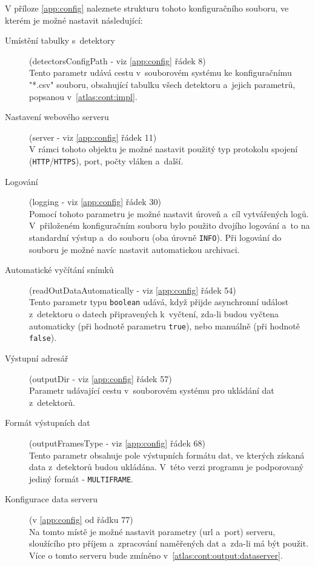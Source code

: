 V příloze \ref{app:config} naleznete strukturu tohoto konfiguračního souboru, ve kterém je možné nastavit následující:
\begin{description}
	\item[Umístění tabulky s~detektory] (detectorsConfigPath - viz \ref{app:config} řádek 8)\\
		Tento parametr udává cestu v~souborovém systému ke konfiguračnímu "*.csv" souboru, obsahující tabulku všech detektoru a~jejich parametrů, popsanou v~\ref{atlas:cont:impl}.
	\item[Nastavení webového serveru] (server - viz \ref{app:config} řádek 11)\\
		V rámci tohoto objektu je možné nastavit použitý typ protokolu spojení (\texttt{HTTP}/\texttt{HTTPS}), port, počty vláken a~další.
	\item[Logování] (logging - viz \ref{app:config} řádek 30)\\
		Pomocí tohoto parametru je možné nastavit úroveň a~cíl vytvářených logů. V~přiloženém konfiguračním souboru bylo použito dvojího logování a~to na standardní výstup a~do souboru (oba úrovně \texttt{INFO}). Při logování do souboru je možné navíc nastavit automatickou archivaci.
	\item[Automatické vyčítání snímků] (readOutDataAutomatically - viz \ref{app:config} řádek 54)\\
		Tento parametr typu \texttt{boolean} udává, když přijde asynchronní událost z~detektoru o datech připravených k~vyčtení, zda-li budou vyčtena automaticky (při hodnotě parametru \texttt{true}), nebo manuálně (při hodnotě \texttt{false}).
	\item[Výstupní adresář] (outputDir - viz \ref{app:config} řádek 57)\\
		Parametr udávající cestu v~souborovém systému pro ukládání dat z~detektorů.
	\item[Formát výstupních dat] (outputFramesType - viz \ref{app:config} řádek 68)\\
		Tento parametr obsahuje pole výstupních formátu dat, ve kterých získaná data z~detektorů budou ukládána. V~této verzi programu je podporovaný jediný formát - \texttt{MULTIFRAME}.
	\item[Konfigurace data serveru] (v \ref{app:config} od řádku 77)\\
		Na tomto místě je možné nastavit parametry (url a~port) serveru, sloužícího pro příjem a~zpracování naměřených dat a~zda-li má být použit. Více o tomto serveru bude zmíněno v~\ref{atlas:cont:output:dataserver}.
\end{description}

